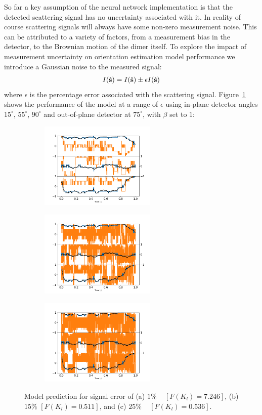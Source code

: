 \documentclass[12pt]{spieman}
\begin{document}
\begin{spacing}{1.5}
So far a key assumption of the neural network implementation is that the detected scattering signal has no uncertainty associated with it. In reality of course scattering signals will always have some non-zero measurement noise. This can be attributed to a variety of factors, from a measurement bias in the detector, to the Brownian motion of the dimer itself. To explore the impact of measurement uncertainty on orientation estimation model performance we introduce a Gaussian noise to the measured signal:
\begin{align}
	I(\hat{\bf s}) = I(\hat{\bf s}) \pm \epsilon I(\hat{\bf s})
\end{align}
where $\epsilon$ is the percentage error associated with the scattering signal. Figure~\ref{fig:epsilon} shows the performance of the model at a range of $\epsilon$ using in-plane detector angles $15^{\circ}$, $55^{\circ}$, $90^{\circ}$ and out-of-plane detector at $75^{\circ}$, with $\beta$ set to $1$:

\begin{figure}[h]
	\centering
	\begin{subfigure}{0.32\textwidth}
		\subcaption{}
		\includegraphics[width=5.5cm]{./Images/fig10a.png}
	\end{subfigure}
	\begin{subfigure}{0.32\textwidth}
		\subcaption{}
		\includegraphics[width=5.5cm]{./Images/fig10b.png}
	\end{subfigure}
	\begin{subfigure}{0.32\textwidth}
		\subcaption{}
		\includegraphics[width=5.5cm]{./Images/fig10c.png}
	\end{subfigure}
	\caption{Model prediction for signal error of (a) $1\%$ ~  $[F(K_l)=7.246]$, (b) $15\%$ $[F(K_l)=0.511]$, and (c) $25\%$ ~  $[F(K_l)=0.536]$.}
	\label{fig:epsilon}
\end{figure}


\end{spacing}
\end{document}

